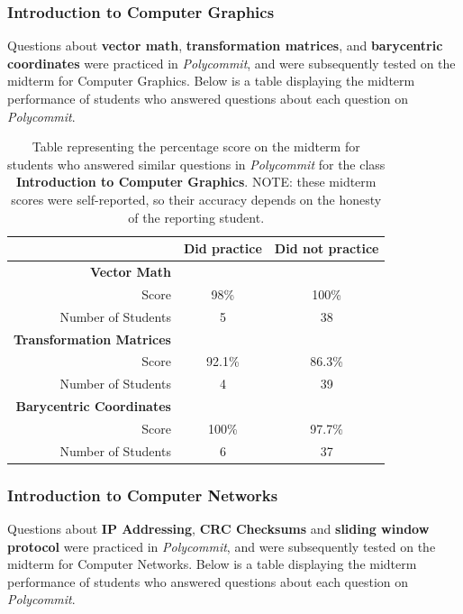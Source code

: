 \subsubsection{Introduction to Computer Graphics}

\par Questions about \textbf{vector math}, \textbf{transformation matrices}, and \textbf{barycentric coordinates} were practiced in \textit{Polycommit}, and were subsequently tested on the midterm for Computer Graphics. Below is a table displaying the midterm performance of students who answered questions about each question on \textit{Polycommit}.

\begin{table}
	\begin{tabular}[h!]{ r c c }
		& \textbf{Did practice} & \textbf{Did not practice} \\
		\hline
		\textbf{Vector Math} & & \\
		Score & 98\% & 100\%  \\
		Number of Students & 5 & 38 \\
		
		\hline
		\textbf{Transformation Matrices} & &  \\
		Score  & 92.1\% & 86.3\% \\
		Number of Students & 4 & 39 \\
		
		\hline
		\textbf{Barycentric Coordinates} & &  \\
		Score  & 100\% & 97.7\% \\
		Number of Students & 6 & 37 \\
		
	\end{tabular}
\caption{Table representing the percentage score on the midterm for students who answered similar questions in \textit{Polycommit} for the class \textbf{Introduction to Computer Graphics}. NOTE: these midterm scores were self-reported, so their accuracy depends on the honesty of the reporting student.}
\end{table}

\subsubsection{Introduction to Computer Networks}

\par Questions about \textbf{IP Addressing}, \textbf{CRC Checksums} and \textbf{sliding window protocol} were practiced in \textit{Polycommit}, and were subsequently tested on the midterm for Computer Networks. Below is a table displaying the midterm performance of students who answered questions about each question on \textit{Polycommit}.

